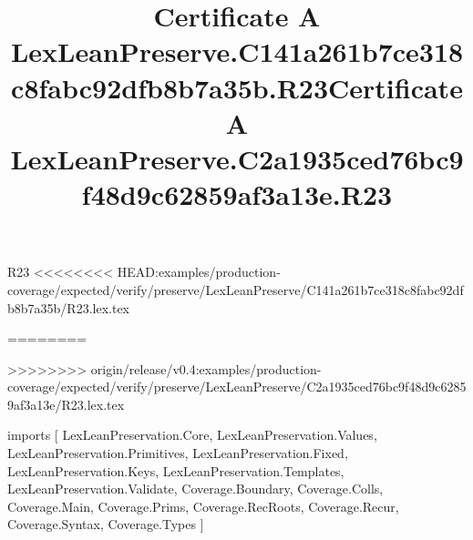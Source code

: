 \begin{lexlean}{R23}
<<<<<<<< HEAD:examples/production-coverage/expected/verify/preserve/LexLeanPreserve/C141a261b7ce318c8fabc92dfb8b7a35b/R23.lex.tex
\title{Certificate A LexLeanPreserve.C141a261b7ce318c8fabc92dfb8b7a35b.R23}
========
\title{Certificate A LexLeanPreserve.C2a1935ced76bc9f48d9c62859af3a13e.R23}
>>>>>>>> origin/release/v0.4:examples/production-coverage/expected/verify/preserve/LexLeanPreserve/C2a1935ced76bc9f48d9c62859af3a13e/R23.lex.tex
\begin{coremodule}
imports [
  LexLeanPreservation.Core,
  LexLeanPreservation.Values,
  LexLeanPreservation.Primitives,
  LexLeanPreservation.Fixed,
  LexLeanPreservation.Keys,
  LexLeanPreservation.Templates,
  LexLeanPreservation.Validate,
  Coverage.Boundary,
  Coverage.Colls,
  Coverage.Main,
  Coverage.Prims,
  Coverage.RecRoots,
  Coverage.Recur,
  Coverage.Syntax,
  Coverage.Types
]


\end{coremodule}
\end{lexlean}
